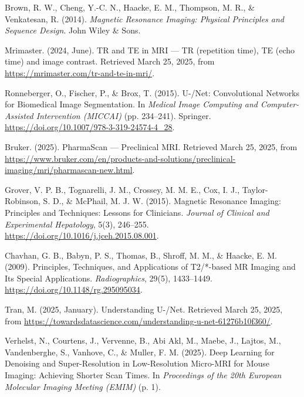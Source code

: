\documentclass[twocolumn]{article}
\begin{document}
\newpage
\onecolumn
\nocite{*}
\begin{thebibliography}{99}

     Brown, R. W., Cheng, Y.-C. N., Haacke, E. M., Thompson, M. R., \& Venkatesan, R. (2014). \textit{Magnetic Resonance Imaging: Physical Principles and Sequence Design}. John Wiley \& Sons.
    
     Mrimaster. (2024, June). TR and TE in MRI — TR (repetition time), TE (echo time) and image contrast. Retrieved March 25, 2025, from \url{https://mrimaster.com/tr-and-te-in-mri/}.
    
     Ronneberger, O., Fischer, P., \& Brox, T. (2015). U-/Net: Convolutional Networks for Biomedical Image Segmentation. In \textit{Medical Image Computing and Computer-Assisted Intervention (MICCAI)} (pp. 234–241). Springer. \url{https://doi.org/10.1007/978-3-319-24574-4_28}.
    
     Bruker. (2025). PharmaScan — Preclinical MRI. Retrieved March 25, 2025, from \url{https://www.bruker.com/en/products-and-solutions/preclinical-imaging/mri/pharmascan-new.html}.
    
     Grover, V. P. B., Tognarelli, J. M., Crossey, M. M. E., Cox, I. J., Taylor-Robinson, S. D., \& McPhail, M. J. W. (2015). Magnetic Resonance Imaging: Principles and Techniques: Lessons for Clinicians. \textit{Journal of Clinical and Experimental Hepatology}, 5(3), 246–255. \url{https://doi.org/10.1016/j.jceh.2015.08.001}.
    
     Chavhan, G. B., Babyn, P. S., Thomas, B., Shroff, M. M., \& Haacke, E. M. (2009). Principles, Techniques, and Applications of T2/*-based MR Imaging and Its Special Applications. \textit{Radiographics}, 29(5), 1433–1449. \url{https://doi.org/10.1148/rg.295095034}.
    
     Tran, M. (2025, January). Understanding U-/Net. Retrieved March 25, 2025, from \url{https://towardsdatascience.com/understanding-u-net-61276b10f360/}.
    
     Verhelst, N., Courtens, J., Vervenne, B., Abi Akl, M., Maebe, J., Lajtos, M., Vandenberghe, S., Vanhove, C., \& Muller, F. M. (2025). Deep Learning for Denoising and Super-Resolution in Low-Resolution Micro-MRI for Mouse Imaging: Achieving Shorter Scan Times. In \textit{Proceedings of the 20th European Molecular Imaging Meeting (EMIM)} (p. 1).
    

\end{thebibliography}
\end{document}
